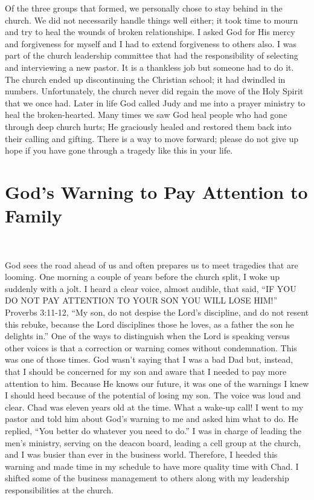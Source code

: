\documentclass[twoside, 12pt]{book}
\begin{document}
Of the three groups that formed, we personally chose to stay behind in the church. We did not necessarily handle things well either; it took time to mourn and try to heal the wounds of broken relationships. I asked God for His mercy and forgiveness for myself and I had to extend forgiveness to others also. I was part of the church leadership committee that had the responsibility of selecting and interviewing a new pastor. It is a thankless job but someone had to do it. The church ended up discontinuing the Christian school; it had dwindled in numbers. Unfortunately, the church never did regain the move of the Holy Spirit that we once had. Later in life God called Judy and me into a prayer ministry to heal the broken-hearted. Many times we saw God heal people who had gone through deep church hurts; He graciously healed and restored them back into their calling and gifting. There is a way to move forward; please do not give up hope if you have gone through a tragedy like this in your life.

\clearpage

\section{God's Warning to Pay Attention to Family}
\

God sees the road ahead of us and often prepares us to meet tragedies that are looming. One morning a couple of years before the church split, I woke up suddenly with a jolt. I heard a clear voice, almost audible, that said, “IF YOU DO NOT PAY ATTENTION TO YOUR SON YOU WILL LOSE HIM!” Proverbs 3:11-12, “My son, do not despise the Lord's discipline, and do not resent this rebuke, because the Lord disciplines those he loves, as a father the son he delights in.” One of the ways to distinguish when the Lord is speaking versus other voices is that a correction or warning comes without condemnation. This was one of those times. God wasn't saying that I was a bad Dad but, instead, that I should be concerned for my son and aware that I needed to pay more attention to him. Because He knows our future, it was one of the warnings I knew I should heed because of the potential of losing my son. The voice was loud and clear. Chad was eleven years old at the time. What a wake-up call! I went to my pastor and told him about God’s warning to me and asked him what to do. He replied, “You better do whatever you need to do.” I was in charge of leading the men's ministry, serving on the deacon board, leading a cell group at the church, and I was busier than ever in the business world. Therefore, I heeded this warning and made time in my schedule to have more quality time with Chad. I shifted some of the business management to others along with my leadership responsibilities at the church.
\end{document}
